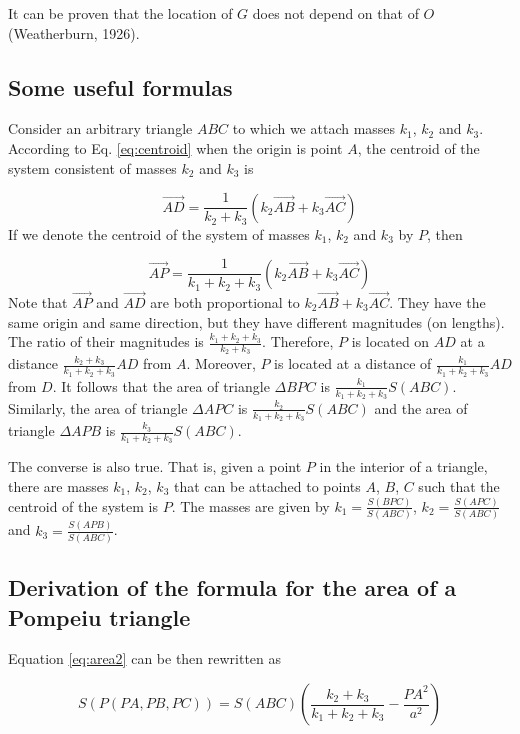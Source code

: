 \documentclass[12pt]{article}
\begin{document}
It can be proven that the location of $G$ does not depend on that of $O$ (Weatherburn, 1926).

\subsection{Some useful formulas}
Consider an arbitrary triangle $ABC$ to which we attach masses $k_1$, $k_2$ and $k_3$. According to Eq. \ref{eq:centroid} when the origin is point $A$, the centroid of the system consistent of masses $k_2$ and $k_3$ is

\begin{equation}
\vec{AD}=\frac{1}{k_2+k_3}(k_2\vec{AB}+k_3\vec{AC})
\end{equation}
If we denote the centroid of the system of masses $k_1$, $k_2$ and $k_3$ by $P$, then

\begin{equation}
\vec{AP}=\frac{1}{k_1+k_2+k_3}(k_2\vec{AB}+k_3\vec{AC})
\label{eq:centroid2}
\end{equation}
Note that $\vec{AP}$ and $\vec{AD}$ are both proportional to $k_2 \vec{AB}+ k_3\vec{AC}$.  They have the same origin and same direction, but they have different magnitudes (on lengths). The ratio of their magnitudes is $\frac{k_1+k_2+k_3}{k_2+k_3}$.  Therefore, $P$ is located on $AD$ at a distance $\frac{k_2+k_3}{k_1+k_2+k_3} AD$ from $A$.  Moreover, $P$ is located at a distance of $\frac{k_1}{k_1+k_2+k_3} AD$ from $D$. It follows that the area of triangle $\Delta BPC$ is $\frac{k_1}{k_1+k_2+k_3} S(ABC)$. Similarly, the area of triangle $\Delta APC$ is $\frac{k_2}{k_1+k_2+k_3} S(ABC)$ and the area of triangle $\Delta APB$ is $\frac{k_3}{k_1+k_2+k_3} S(ABC)$.  

The converse is also true. That is, given a point $P$ in the interior of a triangle, there are masses $k_1$, $k_2$, $k_3$ that can be attached to points $A$, $B$, $C$ such that the centroid of the system is $P$.  The masses are given by $k_1=\frac{S(BPC)}{S(ABC)}$, $k_2=\frac{S(APC)}{S(ABC)}$ and $k_3=\frac{S(APB)}{S(ABC)}$.

\subsection{Derivation of the formula for the area of a Pompeiu triangle}
Equation \ref{eq:area2} can be then rewritten as

\begin{equation}
S(P(PA,PB,PC))=S(ABC)\left(\frac{k_2+k_3}{k_1+k_2+k_3}-\frac{PA^2}{a^2}\right)
\label{eq:area3}
\end{equation}
\end{document}
